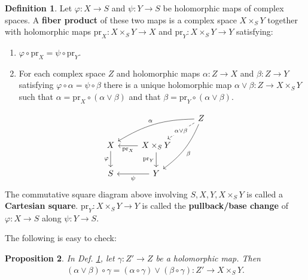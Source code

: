 \documentclass[12pt,b5paper,notitlepage]{report}
\theoremstyle{definition}
\newtheorem{df}{Definition}[section]
\theoremstyle{plain}
\newtheorem{pp}[df]{Proposition}
\newcommand{\pr}{\mathrm {pr}}
\numberwithin{equation}{section}
\begin{document}
\begin{df}\label{lb36}
Let $\varphi:X\rightarrow S$ and $\psi:Y\rightarrow S$ be holomorphic maps of complex spaces. A \textbf{fiber product} of these two maps  is a complex space $X\times_SY$ together with holomorphic maps $\pr_X:X\times_SY\rightarrow X$ and $\pr_Y:X\times_SY\rightarrow Y$ satisfying:
\begin{enumerate}[label=(\arabic*)]
\item $\varphi\circ\pr_X=\psi\circ\pr_Y$.
\item For each complex space $Z$ and holomorphic maps $\alpha:Z\rightarrow X$ and $\beta:Z\rightarrow Y$ satisfying $\varphi\circ\alpha=\psi\circ\beta$ there is a unique holomorphic map $\alpha\vee\beta:Z\rightarrow X\times_SY$  such that $\alpha=\pr_X\circ(\alpha\vee\beta)$ and that $\beta=\pr_Y\circ(\alpha\vee\beta)$.
\end{enumerate}
\begin{equation}
\begin{tikzcd}
                  &                                    & Z \arrow[ld, "\alpha\vee\beta" description, dashed] \arrow[lld, "\alpha"',bend right=15] \arrow[ldd, "\beta", bend left=15] \\
X \arrow[d, "\varphi"'] & X\times_SY \arrow[l, "\pr_X"] \arrow[d, "\pr_Y"'] &                                                               \\
S                 & Y \arrow[l, "\psi"]                  &                                                              
\end{tikzcd}
\end{equation}
The commutative square diagram above involving $S,X,Y,X\times_SY$ is called a \textbf{Cartesian square}.   $\pr_Y:X\times_SY\rightarrow Y$ is called the \textbf{pullback/base change} of $\varphi:X\rightarrow S$ along $\psi:Y\rightarrow S$.  \hfill\qedsymbol 
\end{df}

The following is easy to check:

\begin{pp}\label{lb37}
In Def. \ref{lb36}, let $\gamma:Z'\rightarrow Z$ be a holomorphic map. Then
\begin{align}
(\alpha\vee\beta)\circ\gamma=(\alpha\circ\gamma)\vee(\beta\circ\gamma):Z'\rightarrow X\times_SY.
\end{align}
\end{pp}
\end{document}

